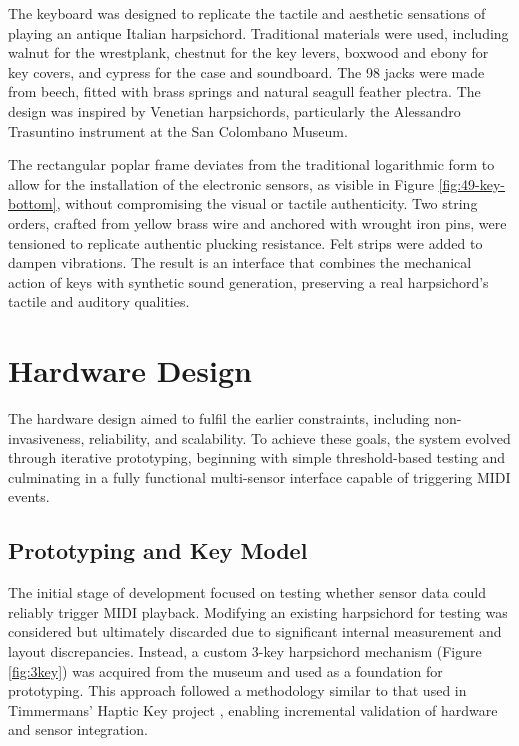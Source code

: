 The keyboard was designed to replicate the tactile and aesthetic sensations of playing an antique Italian harpsichord. Traditional materials were used, including walnut for the wrestplank, chestnut for the key levers, boxwood and ebony for key covers, and cypress for the case and soundboard. The 98 jacks were made from beech, fitted with brass springs and natural seagull feather plectra. The design was inspired by Venetian harpsichords, particularly the Alessandro Trasuntino instrument at the San Colombano Museum. 

The rectangular poplar frame deviates from the traditional logarithmic form to allow for the installation of the electronic sensors, as visible in Figure \ref{fig:49-key-bottom}, without compromising the visual or tactile authenticity. Two string orders, crafted from yellow brass wire and anchored with wrought iron pins, were tensioned to replicate authentic plucking resistance. Felt strips were added to dampen vibrations. The result is an interface that combines the mechanical action of keys with synthetic sound generation, preserving a real harpsichord's tactile and auditory qualities.


\section{Hardware Design}\label{hardware-design}

The hardware design aimed to fulfil the earlier constraints, including non-invasiveness, reliability, and scalability. To achieve these goals, the system evolved through iterative prototyping, beginning with simple threshold-based testing and culminating in a fully functional multi-sensor interface capable of triggering MIDI events.

\subsection{Prototyping and Key Model}

The initial stage of development focused on testing whether sensor data could reliably trigger MIDI playback. Modifying an existing harpsichord for testing was considered but ultimately discarded due to significant internal measurement and layout discrepancies. Instead, a custom 3-key harpsichord mechanism (Figure \ref{fig:3key}) was acquired from the museum and used as a foundation for prototyping. This approach followed a methodology similar to that used in Timmermans' Haptic Key project \cite{Timmermans2020}, enabling incremental validation of hardware and sensor integration.

